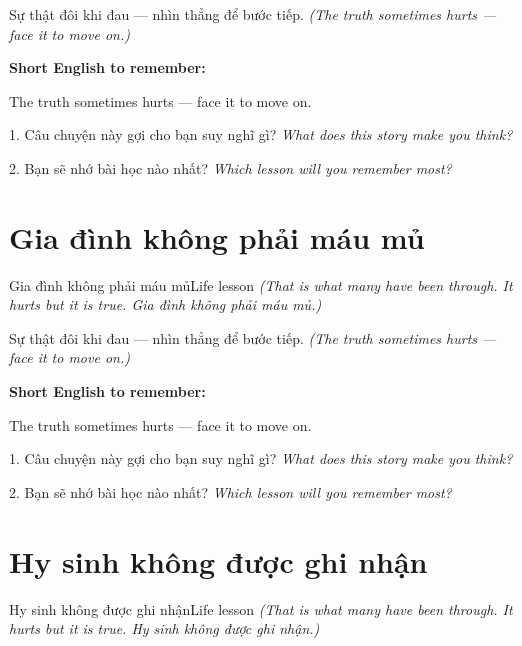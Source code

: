 \begin{baihoc}
Sự thật đôi khi đau — nhìn thẳng để bước tiếp.
\textit{(The truth sometimes hurts — face it to move on.)}
\end{baihoc}

\begin{ghinhoanh}
\textbf{Short English to remember:}

The truth sometimes hurts — face it to move on.

\end{ghinhoanh}

\begin{tuhocnhanh}
1. Câu chuyện này gợi cho bạn suy nghĩ gì? \textit{What does this story make you think?}

2. Bạn sẽ nhớ bài học nào nhất? \textit{Which lesson will you remember most?}
\end{tuhocnhanh}
\ngancach


\section{Gia đình không phải máu mủ}
\begin{truyen}{Gia đình không phải máu mủ}{Life lesson}
\textit{(That is what many have been through. It hurts but it is true. Gia đình không phải máu mủ.)}
\end{truyen}

\begin{baihoc}
Sự thật đôi khi đau — nhìn thẳng để bước tiếp.
\textit{(The truth sometimes hurts — face it to move on.)}
\end{baihoc}

\begin{ghinhoanh}
\textbf{Short English to remember:}

The truth sometimes hurts — face it to move on.

\end{ghinhoanh}

\begin{tuhocnhanh}
1. Câu chuyện này gợi cho bạn suy nghĩ gì? \textit{What does this story make you think?}

2. Bạn sẽ nhớ bài học nào nhất? \textit{Which lesson will you remember most?}
\end{tuhocnhanh}
\ngancach


\section{Hy sinh không được ghi nhận}
\begin{truyen}{Hy sinh không được ghi nhận}{Life lesson}
\textit{(That is what many have been through. It hurts but it is true. Hy sinh không được ghi nhận.)}
\end{truyen}

